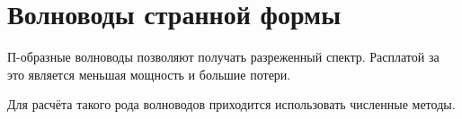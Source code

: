 \section{Волноводы странной формы}

П-образные волноводы позволяют получать разреженный спектр. Расплатой за это является меньшая мощность и большие потери.

Для расчёта такого рода волноводов приходится использовать численные методы.
